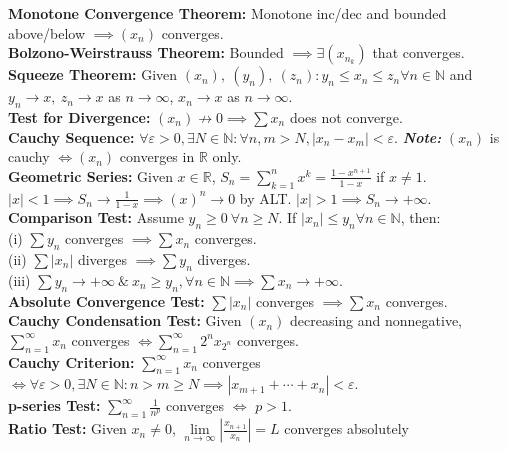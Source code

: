 \documentclass{letter}
\begin{document}
\textbf{Monotone Convergence Theorem:} Monotone inc/dec and bounded
above/below $\implies (x_n)$ converges. \\
\textbf{Bolzono-Weirstrauss Theorem:} Bounded $\implies \exists
(x_{n_k})$ that converges. \\
\textbf{Squeeze Theorem:} Given $(x_n), \ (y_n), \ (z_n) : y_n \leq
x_n \leq z_n \forall n \in \mathbb{N}$ and $y_n \to x, \ z_n \to x$ as
$n \to \infty$, $x_n \to x$ as $n \to \infty$. \\
\textbf{Test for Divergence:} $(x_n) \not\rightarrow 0 \implies \sum x_n$ does
not converge. \\
\textbf{Cauchy Sequence:} $\forall \varepsilon > 0, \exists N \in
\mathbb{N} : \forall n,m > N, |x_n - x_m| <
\varepsilon$. \textit{\textbf{Note:}} $(x_n)$ is cauchy $\iff (x_n)$
converges in $\mathbb{R}$ only. \\
\textbf{Geometric Series:} Given $x \in \mathbb{R}$, $S_n =
\sum\limits_{k = 1}^{n} x^k = \frac{1 - x^{n + 1}}{1 - x}$ if $x \neq
1$. $|x| < 1 \implies S_n \rightarrow \frac{1}{1 - x} \implies (x)^n
\rightarrow 0$ by ALT. $|x| > 1 \implies S_n \rightarrow +\infty$. \\
\textbf{Comparison Test:} Assume $y_n \geq 0 \ \forall n \geq
N$. If $|x_n| \leq y_n \forall n \in \mathbb{N}$, then: \\
(i) $\sum y_n$ converges $\implies \sum x_n$ converges. \\
(ii) $\sum |x_n|$ diverges $\implies \sum y_n$ diverges. \\
(iii) $\sum y_n \rightarrow +\infty \ \& \ x_n \geq y_n, \forall n \in
\mathbb{N} \implies \sum x_n \rightarrow +\infty$. \\
\textbf{Absolute Convergence Test:} $\sum |x_n|$ converges $\implies
\sum x_n$ converges. \\
\textbf{Cauchy Condensation Test:} Given $(x_n)$ decreasing and
nonnegative, $\sum\limits_{n = 1}^{\infty} x_n$ converges $\iff
\sum\limits_{n = 1}^{\infty} 2^nx_{2^n}$ converges. \\
\textbf{Cauchy Criterion:} $\sum\limits_{n = 1}^{\infty} x_n$
converges $\iff \forall \varepsilon > 0, \exists N \in \mathbb{N} : n
> m \geq N \implies |x_{m + 1} + \cdots + x_n| < \varepsilon$. \\
\textbf{p-series Test:} $\sum\limits_{n = 1}^{\infty} \frac{1}{n^p}$
converges $\iff$ $p > 1$. \\
\textbf{Ratio Test:} Given $x_n \neq 0$, $\lim\limits_{n \to
  \infty}\left| \frac{x_{n + 1}}{x_n} \right| = L$ converges absolutely
\end{document}
